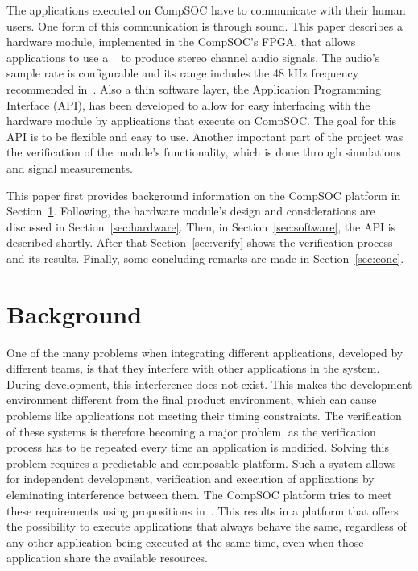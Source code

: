 The applications executed on CompSOC have to communicate with their human users. One form of this communication is through sound. This paper describes a hardware module, implemented in the CompSOC's FPGA, that allows applications to use a \digipmod~\cite{pmodsheet}  to produce stereo channel audio signals. The audio's sample rate is configurable and its range includes the 48 kHz frequency recommended in~\cite{aesrecommendation}. Also a thin software layer, the Application Programming Interface (API),  has been developed to allow for easy interfacing with the hardware module by applications that execute on CompSOC. The goal for this API is to be flexible and easy to use. Another important part of the project was the verification of the module's functionality, which is done through simulations and signal measurements. 

This paper first provides background information on the CompSOC platform in Section~\ref{sec:background}. Following, the hardware module's design and considerations are discussed in Section~\ref{sec:hardware}. Then, in Section~\ref{sec:software}, the API is described shortly. After that Section~\ref{sec:verify} shows the verification process and its results. Finally, some concluding remarks are made in Section~\ref{sec:conc}.

\section{Background}\label{sec:background}
One of the many problems when integrating different applications, developed by different teams, is that they interfere with other applications in the system. During development, this interference does not exist. This makes the development environment different from the final product environment, which can cause problems like applications not meeting their timing constraints. The verification of these systems is therefore becoming a major problem, as the verification process has to be repeated every time an application is modified. Solving this problem requires a predictable and composable platform. Such a system allows for independent development, verification and execution of applications by eleminating interference between them. The CompSOC platform tries to meet these requirements using propositions in~\cite{akesson2009composable}. This results in a platform that offers the possibility to execute applications that always behave the same, regardless of any other application being executed at the same time, even when those application share the available resources.

